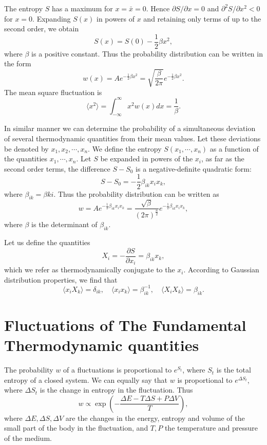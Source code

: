 \documentclass{book}
\newcommand{\average}[1]{\langle#1\rangle}
\numberwithin{equation}{section}
\begin{document}
The entropy $S$ has a maximum for $x=\bar{x}=0$. Hence 
$\partial S/\partial x=0$ and $\partial^2S/\partial x^2<0$ for $x=0$.
Expanding $S(x)$ in powers of $x$ and retaining only terms of up to the 
second order, we obtain
\begin{equation}
  S(x)=S(0)-\frac{1}{2}\beta x^2,
\end{equation}
where $\beta$ is a positive constant. Thus the probability distribution can be
written in the form
\begin{equation}
  w(x)=Ae^{-\frac{1}{2}\beta x^2}=\sqrt{\frac{\beta}{2\pi}}
  e^{-\frac{1}{2}\beta x^2}.
\end{equation}
The mean square fluctuation is 
\begin{equation}
  \average{x^2}=\int_{-\infty}^\infty x^2w(x)dx=\frac{1}{\beta}.
\end{equation}

In similar manner we can determine the probability of a simultaneous
deviation of several thermodynamic quantities from their mean values.
Let these deviations be denoted by $x_1,x_2,\cdots,x_n$. We define the
entropy $S(x_1,\cdots,x_n)$ as a function of the quantities
$x_1,\cdots,x_n$. Let $S$ be expanded in powers of the $x_i$, as far
as the second order terms, the difference $S-S_0$ is a
negative-definite quadratic form:
\begin{equation}
  S-S_0=-\frac{1}{2}\beta_{ik}x_ix_k,
\end{equation}
where $\beta_{ik}=\beta{ki}$. Thus the probability distribution can be
written as
\begin{equation}
  w=Ae^{-\frac{1}{2}\beta_{ik}x_ix_k}=\frac{\sqrt{\beta}}{(2\pi)^{\frac{n}{2}}}
    e^{-\frac{1}{2}\beta_{ik}x_ix_k},
\end{equation}
where $\beta$ is the determinant of $\beta_{ik}$.

Let us define the quantities
\begin{equation}
  X_i=-\frac{\partial S}{\partial x_i}=\beta_{ik}x_k,
\end{equation}
which we refer as thermodynamically conjugate to the $x_i$. According to 
Gaussian distribution properties, we find that
\begin{equation}
  \average{x_iX_k}=\delta_{ik},\quad\average{x_ix_k}=\beta^{-1}_{ik},\quad
  \average{X_iX_k}=\beta_{ik}.
\end{equation}

\section{Fluctuations of The Fundamental Thermodynamic quantities}
The probability $w$ of a fluctuations is proportional to $e^{S_t}$,
where $S_t$ is the total entropy of a closed system. We can equally
say that $w$ is proportional to $e^{\Delta S_t}$, where $\Delta S_t$
is the change in entropy in the fluctuation. Thus
\begin{equation}
  w\propto\exp\left(-\frac{\Delta E-T\Delta S+P\Delta V}{T}\right),
\end{equation}
where $\Delta E,\Delta S, \Delta V$ are the changes in the energy,
entropy and volume of the small part of the body in the fluctuation,
and $T,P$ the temperature and pressure of the medium.
\end{document}
